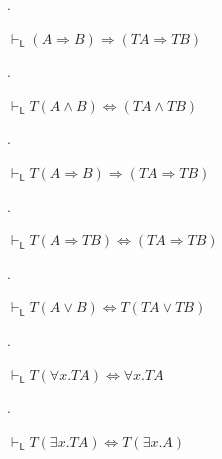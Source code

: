  
 
\par{}. 
 
$\vdash_{\mathsf{L}}(A\mathbin{\Rightarrow}B)\mathbin{\Rightarrow}(TA\mathbin{\Rightarrow}TB)$\par
 
 
 
\par{}. 
 
$\vdash_{\mathsf{L}}T(A\mathbin{\wedge}B)\Leftrightarrow(TA\mathbin{\wedge}TB)$\par
 
 
 
\par{}. 
 
$\vdash_{\mathsf{L}}T(A\mathbin{\Rightarrow}B)\mathbin{\Rightarrow}(TA\mathbin{\Rightarrow}TB)$\par
 
 
 
\par{}. 
 
$\vdash_{\mathsf{L}}T(A\mathbin{\Rightarrow}TB)\Leftrightarrow(TA\mathbin{\Rightarrow}TB)$\par
 
 
 
\par{}. 
 
$\vdash_{\mathsf{L}}T(A\mathbin{\vee}B)\Leftrightarrow T(TA\mathbin{\vee}TB)$\par
 
 
 
\par{}. 
 
$\vdash_{\mathsf{L}}T({\forall}x.TA)\Leftrightarrow{\forall}x.TA$\par
 
 
 
\par{}. 
 
$\vdash_{\mathsf{L}}T({\exists}x.TA)\Leftrightarrow T({\exists}x.A)$\par
 
 
  
 
 

